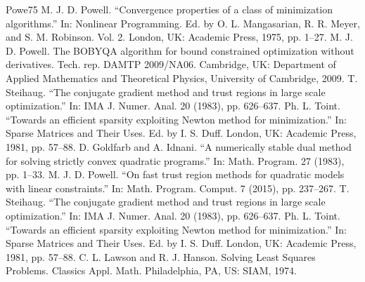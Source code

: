 \documentclass[letterpaper,10pt,english]{sphinxmanual}
\begin{document}
\begin{sphinxthebibliography}{Powe75}
\sphinxAtStartPar
M. J. D. Powell. “Convergence properties of a class of minimization
algorithms.” In: Nonlinear Programming. Ed. by O. L. Mangasarian, R. R.
Meyer, and S. M. Robinson. Vol. 2. London, UK: Academic Press, 1975, pp.
1–27.
\sphinxAtStartPar
M. J. D. Powell. The BOBYQA algorithm for bound constrained
optimization without derivatives. Tech. rep. DAMTP 2009/NA06. Cambridge, UK:
Department of Applied Mathematics and Theoretical Physics, University of
Cambridge, 2009.
\sphinxAtStartPar
T. Steihaug. “The conjugate gradient method and trust regions in
large scale optimization.” In: IMA J. Numer. Anal. 20 (1983), pp. 626–637.
\sphinxAtStartPar
Ph. L. Toint. “Towards an efficient sparsity exploiting Newton
method for minimization.” In: Sparse Matrices and Their Uses. Ed. by I. S.
Duff. London, UK: Academic Press, 1981, pp. 57–88.
\sphinxAtStartPar
D. Goldfarb and A. Idnani. “A numerically stable dual method for
solving strictly convex quadratic programs.” In: Math. Program. 27 (1983),
pp. 1–33.
\sphinxAtStartPar
M. J. D. Powell. “On fast trust region methods for quadratic models
with linear constraints.” In: Math. Program. Comput. 7 (2015), pp. 237–267.
\sphinxAtStartPar
T. Steihaug. “The conjugate gradient method and trust regions in
large scale optimization.” In: IMA J. Numer. Anal. 20 (1983), pp. 626–637.
\sphinxAtStartPar
Ph. L. Toint. “Towards an efficient sparsity exploiting Newton
method for minimization.” In: Sparse Matrices and Their Uses. Ed. by I. S.
Duff. London, UK: Academic Press, 1981, pp. 57–88.
\sphinxAtStartPar
C. L. Lawson and R. J. Hanson. Solving Least Squares Problems.
Classics Appl. Math. Philadelphia, PA, US: SIAM, 1974.
\end{sphinxthebibliography}



\renewcommand{\indexname}{Index}
\printindex
\end{document}
